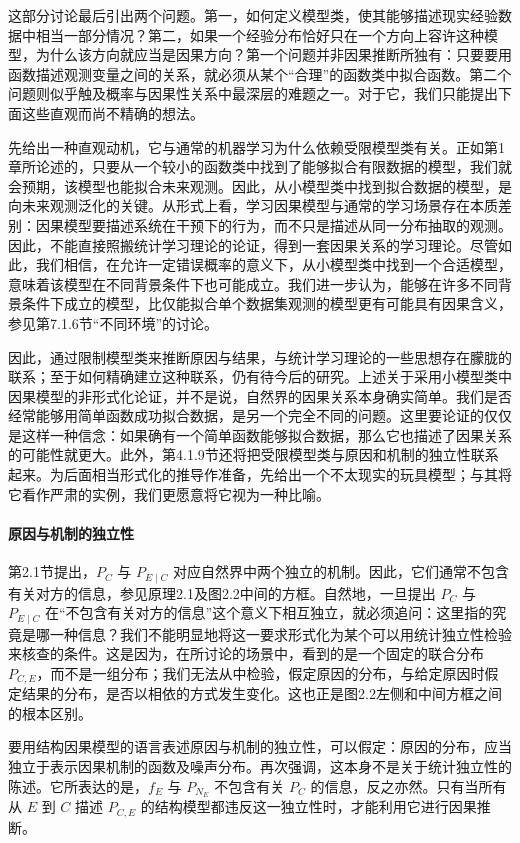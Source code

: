 这部分讨论最后引出两个问题。第一，如何定义模型类，使其能够描述现实经验数据中相当一部分情况？第二，如果一个经验分布恰好只在一个方向上容许这种模型，为什么该方向就应当是因果方向？第一个问题并非因果推断所独有：只要要用函数描述观测变量之间的关系，就必须从某个“合理”的函数类中拟合函数。第二个问题则似乎触及概率与因果性关系中最深层的难题之一。对于它，我们只能提出下面这些直观而尚不精确的想法。

先给出一种直观动机，它与通常的机器学习为什么依赖受限模型类有关。正如第1章所论述的，只要从一个较小的函数类中找到了能够拟合有限数据的模型，我们就会预期，该模型也能拟合未来观测。因此，从小模型类中找到拟合数据的模型，是向未来观测泛化的关键。从形式上看，学习因果模型与通常的学习场景存在本质差别：因果模型要描述系统在干预下的行为，而不只是描述从同一分布抽取的观测。因此，不能直接照搬统计学习理论的论证，得到一套因果关系的学习理论。尽管如此，我们相信，在允许一定错误概率的意义下，从小模型类中找到一个合适模型，意味着该模型在不同背景条件下也可能成立。我们进一步认为，能够在许多不同背景条件下成立的模型，比仅能拟合单个数据集观测的模型更有可能具有因果含义，参见第7.1.6节“不同环境”的讨论。

因此，通过限制模型类来推断原因与结果，与统计学习理论的一些思想存在朦胧的联系；至于如何精确建立这种联系，仍有待今后的研究。上述关于采用小模型类中因果模型的非形式化论证，并不是说，自然界的因果关系本身确实简单。我们是否经常能够用简单函数成功拟合数据，是另一个完全不同的问题。这里要论证的仅仅是这样一种信念：如果确有一个简单函数能够拟合数据，那么它也描述了因果关系的可能性就更大。此外，第4.1.9节还将把受限模型类与原因和机制的独立性联系起来。为后面相当形式化的推导作准备，先给出一个不太现实的玩具模型；与其将它看作严肃的实例，我们更愿意将它视为一种比喻。

\paragraph{原因与机制的独立性}
第2.1节提出，$P_C$ 与 $P_{E\mid C}$ 对应自然界中两个独立的机制。因此，它们通常不包含有关对方的信息，参见原理2.1及图2.2中间的方框。自然地，一旦提出 $P_C$ 与 $P_{E\mid C}$ 在“不包含有关对方的信息”这个意义下相互独立，就必须追问：这里指的究竟是哪一种信息？我们不能明显地将这一要求形式化为某个可以用统计独立性检验来核查的条件。这是因为，在所讨论的场景中，看到的是一个固定的联合分布 $P_{C,E}$，而不是一组分布；我们无法从中检验，假定原因的分布，与给定原因时假定结果的分布，是否以相依的方式发生变化。这也正是图2.2左侧和中间方框之间的根本区别。

要用结构因果模型的语言表述原因与机制的独立性，可以假定：原因的分布，应当独立于表示因果机制的函数及噪声分布。再次强调，这本身不是关于统计独立性的陈述。它所表达的是，$f_E$ 与 $P_{N_E}$ 不包含有关 $P_C$ 的信息，反之亦然。只有当所有从 $E$ 到 $C$ 描述 $P_{C,E}$ 的结构模型都违反这一独立性时，才能利用它进行因果推断。

